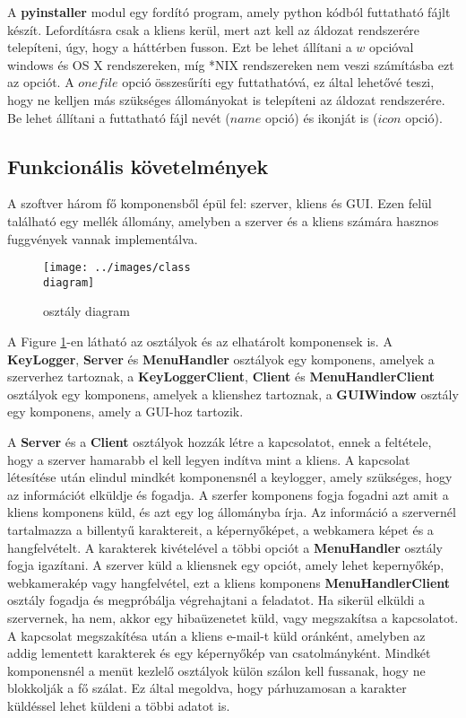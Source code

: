 \documentclass[a4paper, 11pt]{article}
\begin{document}
A \textbf{pyinstaller} modul egy fordító program, amely python kódból futtatható fájlt készít. Lefordításra csak a kliens kerül, mert azt kell az áldozat rendszerére telepíteni, úgy, hogy a háttérben fusson. Ezt be lehet állítani a $w$ opcióval windows és OS X rendszereken, míg *NIX rendszereken nem veszi számításba ezt az opciót. A $onefile$ opció összesűríti egy futtathatóvá, ez által lehetővé teszi, hogy ne kelljen más szükséges állományokat is telepíteni az áldozat rendszerére. Be lehet állítani a futtatható fájl nevét ($name$ opció) és ikonját is ($icon$ opció).



\subsection{Funkcionális követelmények}
A szoftver három fő komponensből épül fel: szerver, kliens és GUI. Ezen felül található egy mellék állomány, amelyben a szerver és a kliens számára hasznos fuggvények vannak implementálva.
\begin{figure}[H]
\centering
\texttt{[image: ../images/class\\ diagram]}
\caption{osztály diagram}
\label{fig:classdia}
\end{figure}
A Figure \ref{fig:classdia}-en látható az osztályok és az elhatárolt komponensek is. A \textbf{KeyLogger}, \textbf{Server} és \textbf{MenuHandler} osztályok egy komponens, amelyek a szerverhez tartoznak, a \textbf{KeyLoggerClient}, \textbf{Client} és \textbf{MenuHandlerClient} osztályok egy komponens, amelyek a klienshez tartoznak, a \textbf{GUIWindow} osztály egy komponens, amely a GUI-hoz tartozik.

A \textbf{Server} és a \textbf{Client} osztályok hozzák létre a kapcsolatot, ennek a feltétele, hogy a szerver hamarabb el kell legyen indítva mint a kliens. A kapcsolat létesítése után elindul mindkét komponensnél a keylogger, amely szükséges, hogy az információt elküldje és fogadja. A szerfer komponens fogja fogadni azt amit a kliens komponens küld, és azt egy log állományba írja. Az információ a szervernél tartalmazza a billentyű karaktereit, a képernyőképet, a webkamera képet és a hangfelvételt. A karakterek kivételével a többi opciót a \textbf{MenuHandler} osztály fogja igazítani. A szerver küld a kliensnek egy opciót, amely lehet kepernyőkép, webkamerakép vagy hangfelvétel, ezt a kliens komponens \textbf{MenuHandlerClient} osztály fogadja és megpróbálja végrehajtani a feladatot. Ha sikerül elküldi a szervernek, ha nem, akkor egy hibaüzenetet küld, vagy megszakítsa a kapcsolatot. A kapcsolat megszakítésa után a kliens e-mail-t küld oránként, amelyben az addig lementett karakterek és egy képernyőkép van csatolmányként. Mindkét komponensnél a menüt kezlelő osztályok külön szálon kell fussanak, hogy ne blokkolják a fő szálat. Ez által megoldva, hogy párhuzamosan a karakter küldéssel lehet küldeni a többi adatot is.
\end{document}
